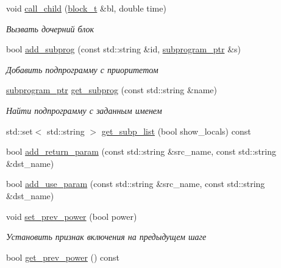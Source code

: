 \begin{DoxyCompactItemize}
void \hyperlink{classLIBKMS__namespace_1_1Block_aa8c287cbddd60507635837e6f9b80f75}{call\-\_\-child} (\hyperlink{classLIBKMS__namespace_1_1Block_ae33d301121e149f8c7cc9a19f7046237}{block\-\_\-t} \&bl, double time)
\begin{DoxyCompactList}\small\item\em Вызвать дочерний блок \end{DoxyCompactList}\item 
bool \hyperlink{classLIBKMS__namespace_1_1Block_ac6de19c8495f98c83949dc70b981752f}{add\-\_\-subprog} (const std\-::string \&id, \hyperlink{classLIBKMS__namespace_1_1Block_aa267fa3009a53828cb55cd853ff4c1b6}{subprogram\-\_\-ptr} \&s)
\begin{DoxyCompactList}\small\item\em Добавить подпрограмму с приоритетом \end{DoxyCompactList}\item 
\hyperlink{classLIBKMS__namespace_1_1Block_aa267fa3009a53828cb55cd853ff4c1b6}{subprogram\-\_\-ptr} \hyperlink{classLIBKMS__namespace_1_1Block_a8687ab032807e767e74d002b546364b7}{get\-\_\-subprog} (const std\-::string \&name)
\begin{DoxyCompactList}\small\item\em Найти подпрограмму с заданным именем \end{DoxyCompactList}\item 
std\-::set$<$ std\-::string $>$ \hyperlink{classLIBKMS__namespace_1_1Block_a5145a4cbdf4f2f82e25a5dc30e625f53}{get\-\_\-subp\-\_\-list} (bool show\-\_\-locals) const 
\item 
bool \hyperlink{classLIBKMS__namespace_1_1Block_afe9599aa88516b84f5710216cd5ed85a}{add\-\_\-return\-\_\-param} (const std\-::string \&src\-\_\-name, const std\-::string \&dst\-\_\-name)
\item 
bool \hyperlink{classLIBKMS__namespace_1_1Block_a6b270518bc9d758d72e50a835cac5a9f}{add\-\_\-use\-\_\-param} (const std\-::string \&src\-\_\-name, const std\-::string \&dst\-\_\-name)
\item 
void \hyperlink{classLIBKMS__namespace_1_1Block_a65c37b5d072c50d71c416676196663ac}{set\-\_\-prev\-\_\-power} (bool power)
\begin{DoxyCompactList}\small\item\em Установить признак включения на предыдущем шаге \end{DoxyCompactList}\item 
bool \hyperlink{classLIBKMS__namespace_1_1Block_ad5cbf3d42dd4c5098c894ff5df6c7f21}{get\-\_\-prev\-\_\-power} () const 

\end{DoxyCompactItemize}
